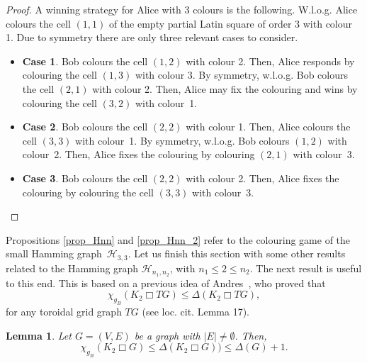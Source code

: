 \documentclass{article}
\newtheorem{lem}[thm]{Lemma}
\newcommand{\chib}{\ensuremath{\chi_{g_B}}}
\begin{document}
\begin{proof} A winning strategy for Alice with 3 colours is the following. W.l.o.g. Alice colours the cell $(1,1)$ of the empty partial Latin square of order $3$ with colour 1. Due to symmetry there are only three relevant cases to consider.
\begin{itemize}
\item {\bf Case 1}. Bob colours the cell $(1,2)$ with colour 2. Then, Alice responds by colouring the cell $(1,3)$ with colour 3. By symmetry, w.l.o.g. Bob colours the cell $(2,1)$ with colour 2. Then, Alice may fix the colouring and wins by colouring the cell $(3,2)$ with colour~1.
\item {\bf Case 2}. Bob colours the cell $(2,2)$ with colour 1. Then, Alice colours the cell $(3,3)$ with colour~1. By symmetry, w.l.o.g. Bob colours $(1,2)$ with colour~2. Then, Alice fixes the colouring by colouring $(2,1)$ with colour~3.
\item {\bf Case 3}. Bob colours the cell $(2,2)$ with colour 2. Then, Alice fixes the colouring by colouring the cell $(3,3)$ with colour~3.
\end{itemize} \vspace{-0.8cm}
\end{proof}

\vspace{0.2cm}

Propositions \ref{prop_Hnn} and \ref{prop_Hnn_2} refer to the colouring game of the small Hamming graph~$\mathcal{H}_{3,3}$. Let us finish this section with some other results related 
to 
the Hamming graph $\mathcal{H}_{n_1,n_2}$, with $n_1\leq 2\leq n_2$. The next result is useful to this end. This is based on a previous idea of Andres~\cite{Andres2003}, who proved 
that 
\[\chib(K_2\Box TG)\le\Delta(K_2\Box TG),\] 
for any toroidal grid graph $TG$ (see loc. cit. Lemma 17).

\begin{lem}\label{helpforKtwo} Let $G=(V,E)$ be a graph with $|E|\neq\emptyset$. Then,
\[\chib(K_2\Box G)\le \Delta(K_2\Box G))\leq \Delta(G)+1.\]
\end{lem}
\end{document}
